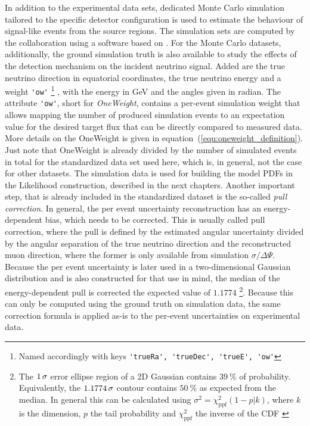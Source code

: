 In addition to the experimental data sets, dedicated Monte Carlo simulation tailored to the specific detector configuration is used to estimate the behaviour of signal-like events from the source regions.
The simulation sets are computed by the collaboration using a software based on \cite{Gazizov:2004va}.
For the Monte Carlo datasets, additionally, the ground simulation truth is also available to study the effects of the detection mechanism on the incident neutrino signal.
Added are the true neutrino direction in equatorial coordinates, the true neutrino energy and a weight \lstinline!'ow'! \footnote{Named accordingly with keys \lstinline!'trueRa', 'trueDec', 'trueE', 'ow'!} , with the energy in GeV and the angles given in radian.
The attribute \lstinline!'ow'!, short for \emph{OneWeight}, contains a per-event simulation weight that allows mapping the number of produced simulation events to an expectation value for the desired target flux that can be directly compared to measured data.
More details on the OneWeight is given in equation~(\ref{equ:oneweight_definition}).
Just note that OneWeight is already divided by the number of simulated events in total for the standardized data set used here, which is, in general, not the case for other datasets.
The simulation data is used for building the model PDFs in the Likelihood construction, described in the next chapters.
Another important step, that is already included in the standardized dataset is the so-called \emph{pull correction}.
In general, the per event uncertainty reconstruction has an energy-dependent bias, which needs to be corrected.
This is usually called pull correction, where the pull is defined by the estimated angular uncertainty divided by the angular separation of the true neutrino direction and the reconstructed muon direction, where the former is only available from simulation $\sigma / \Delta\Psi$.
Because the per event uncertainty is later used in a two-dimensional Gaussian distribution and is also constructed for that use in mind, the median of the energy-dependent pull is corrected the expected value of $\num{1.1774}$ \footnote{The $\num{1}\,\sigma$ error ellipse region of a 2D Gaussian contains $\SI{39}{\percent}$ of probability. Equivalently, the $\num{1.1774}\,\sigma$ contour contains $\SI{50}{\percent}$ as expected from the median. In general this can be calculated using $\sigma^2 = \chi^2_\text{ppf}(1-p|k)$, where $k$ is the dimension, $p$ the tail probability and $\chi^2_\text{ppf}$ the inverse of the CDF \cite{Siotani:1963Gaus}}.
Because this can only be computed using the ground truth on simulation data, the same correction formula is applied as-is to the per-event uncertainties on experimental data.


